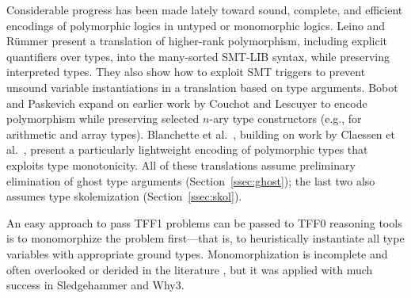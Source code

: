 Considerable progress has been made lately toward sound, complete, and efficient
encodings of polymorphic logics in untyped or monomorphic logics. Leino and
R\"ummer \cite{leino-ruemmer-2010} present a translation of higher-rank
polymorphism, including explicit quantifiers over types, into the many-sorted
SMT-LIB syntax, while preserving interpreted types. They also show how to
exploit SMT triggers to prevent unsound variable instantiations in a
translation based on type arguments. Bobot and Paskevich
\cite{bobot-paskevich-2011} expand on earlier work by Couchot and Lescuyer
\cite{couchot-lescuyer-2007} to encode polymorphism while preserving selected
$n$-ary type constructors (e.g., for arithmetic and array types).
Blanchette et
al.\ \cite{blanchette-et-al-2012-mono}, building on work by Claessen et al.\
\cite{claessen-et-al-2011}, present a particularly lightweight encoding of
polymorphic types that exploits type monotonicity. All of these translations
assume preliminary elimination of ghost type arguments
(Section~\ref{ssec:ghost}); the last two also assumes type skolemization
(Section~\ref{ssec:skol}).

An easy approach to pass TFF1 problems can be passed to TFF0
reasoning tools is to monomorphize the problem first---that is, to heuristically
instantiate all type variables with appropriate
ground types. Monomorphization is incomplete and often overlooked
or derided in the literature \cite[p.\ 3]{couchot-lescuyer-2007}, but it was
applied with much success in Sledgehammer \cite[\S6]{blanchette-et-al-2012-mono}
and Why3.
